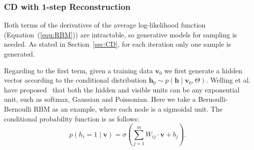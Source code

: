 \subsubsection{CD with 1-step Reconstruction}
\label{sec:cd}
Both terms of the derivatives of the average log-likelihood function (Equation~(\ref{equ:RBM})) are intractable, so generative models for sampling is needed.
As stated in Section~\ref{sec:CD}, for each iteration only one sample is generated.

Regarding to the first term, given a training data $ \mathbf{v}_0 $ we first generate a hidden vector according to the conditional distribution $ \mathbf{h}_0 \sim p( \mathbf{h} \mid \mathbf{v}_0, \Theta) $.
Welling et al. have proposed~\cite{welling2004exponential} that both the hidden and visible units can be any exponential unit, such as softmax, Gaussian and Poissonian.
Here we take a Bernoulli-Bernoulli RBM as an example, where each node is a sigmoidal unit.
The conditional probability function is as follows:
\begin{equation}
p(h_i = 1 \mid \mathbf{v}) = \sigma(\sum_{j=1}^{m} W_{ij} \cdot \mathbf{v} + b_j).
\end{equation}


